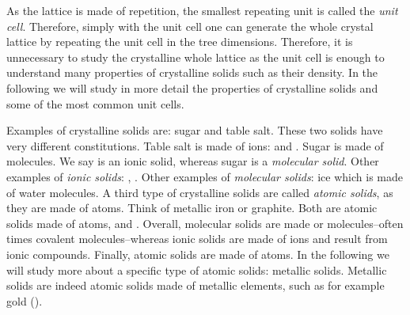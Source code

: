 \documentclass[main.tex]{subfiles}
\newcommand\chapterlabel{solids}
\begin{document}
\begin{description}
\begin{center}
\end{center}




As the lattice is made of repetition, the smallest repeating unit is called the \emph{unit cell}. Therefore, simply with the unit cell one can generate the whole crystal lattice by repeating the unit cell in the tree dimensions. Therefore, it is unnecessary to study the crystalline whole lattice  as the unit cell is enough to understand many properties of crystalline solids such as their density. In the following we will study in more detail the properties of crystalline solids and some of the most common unit cells.
\item[\docfilehook{Types of crystalline solids}{}] Examples of crystalline solids are: sugar and table salt. These two solids have very different constitutions. Table salt is made of ions:  and . Sugar is made of molecules. We say  is an ionic solid, whereas sugar is a \emph{molecular solid}. Other examples of \emph{ionic solids}: , . Other examples of \emph{molecular solids}: ice which is made of water molecules. A third type of crystalline solids are called \emph{atomic solids}, as they are made of atoms. Think of metallic iron or graphite. Both are atomic solids made of atoms,  and . Overall, molecular solids are made or molecules--often times covalent molecules--whereas ionic solids are made of ions and result from ionic compounds. Finally, atomic solids are made of atoms. In the following we will study more about a specific type of atomic solids: metallic solids. Metallic solids are indeed atomic solids made of metallic elements, such as for example gold ().
     \label{Fig:{\chapterlabel}\thefigurenewcounter}
    
    \hspace{-2cm}\begin{minipage}[b]{1.5\linewidth}



\end{minipage}
\end{description}
\end{document}
